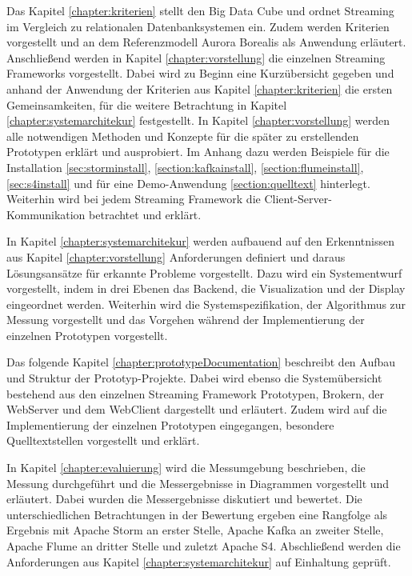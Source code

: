 Das Kapitel \ref{chapter:kriterien} stellt den Big Data Cube und ordnet Streaming im Vergleich zu relationalen Datenbanksystemen ein. Zudem werden Kriterien vorgestellt und an dem Referenzmodell Aurora Borealis als Anwendung erläutert. Anschließend werden in Kapitel \ref{chapter:vorstellung} die einzelnen Streaming Frameworks vorgestellt. Dabei wird zu Beginn eine Kurzübersicht gegeben und anhand der Anwendung der Kriterien aus Kapitel \ref{chapter:kriterien} die ersten Gemeinsamkeiten, für die weitere Betrachtung in Kapitel \ref{chapter:systemarchitekur} festgestellt. In Kapitel \ref{chapter:vorstellung} werden alle notwendigen Methoden und Konzepte für die später zu erstellenden Prototypen erklärt und ausprobiert. Im Anhang dazu werden Beispiele für die Installation \ref{sec:storminstall}, \ref{section:kafkainstall}, \ref{section:flumeinstall}, \ref{sec:s4install} und für eine Demo-Anwendung \ref{section:quelltext} hinterlegt. Weiterhin wird bei jedem Streaming Framework die Client-Server-Kommunikation betrachtet und erklärt.

In Kapitel \ref{chapter:systemarchitekur} werden aufbauend auf den Erkenntnissen aus Kapitel \ref{chapter:vorstellung} Anforderungen definiert und daraus Lösungsansätze für erkannte Probleme vorgestellt. Dazu wird ein Systementwurf vorgestellt, indem in drei Ebenen das Backend, die Visualization und der Display eingeordnet werden. Weiterhin wird die Systemspezifikation, der Algorithmus zur Messung vorgestellt und das Vorgehen während der Implementierung der einzelnen Prototypen vorgestellt.

Das folgende Kapitel \ref{chapter:prototypeDocumentation} beschreibt den Aufbau und Struktur der Prototyp-Projekte. Dabei wird ebenso die Systemübersicht bestehend aus den einzelnen Streaming Framework Prototypen, Brokern, der WebServer und dem WebClient dargestellt und erläutert. Zudem wird auf die Implementierung der einzelnen Prototypen eingegangen, besondere Quelltextstellen vorgestellt und erklärt.

In Kapitel \ref{chapter:evaluierung} wird die Messumgebung beschrieben, die Messung durchgeführt und die Messergebnisse in Diagrammen vorgestellt und erläutert. Dabei wurden die Messergebnisse diskutiert und bewertet. Die unterschiedlichen Betrachtungen in der Bewertung ergeben eine Rangfolge als Ergebnis mit Apache Storm an erster Stelle, Apache Kafka an zweiter Stelle, Apache Flume an dritter Stelle und zuletzt Apache S4. Abschließend werden die Anforderungen aus Kapitel \ref{chapter:systemarchitekur} auf Einhaltung geprüft.

